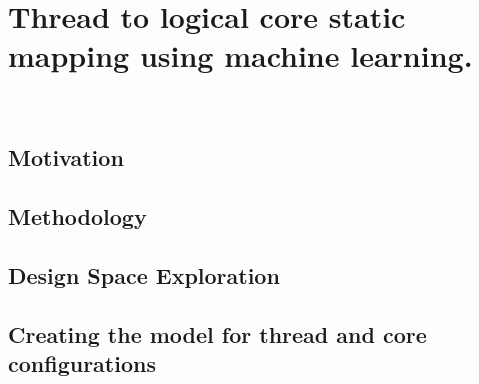 %
%
%
%
%
%
%

\chapter{Thread to logical core static mapping using machine learning.}~\label{chp:streamit}

\label{sec:intro}


%

\section{Motivation}\label{sec:motiviation}


\section{Methodology}\label{chp:stream:sec:setup}


\section{Design Space Exploration}\label{sec:streamit:dse}


\section{Creating the model for thread and core configurations}\label{sec:ml}




